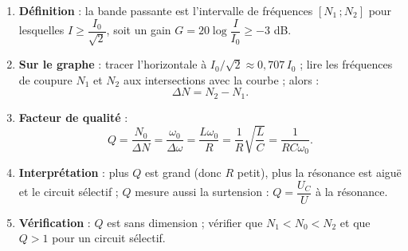 \documentclass[11pt]{article}
\begin{document}
\begin{methode}
\begin{enumerate}
\item \textbf{Définition} : la bande passante est l'intervalle de fréquences $[N_1\,;N_2]$ pour lesquelles $I \geq \dfrac{I_0}{\sqrt{2}}$, soit un gain $G = 20\log\dfrac{I}{I_0} \geq -3$ dB.
\item \textbf{Sur le graphe} : tracer l'horizontale à $I_0/\sqrt{2} \approx 0{,}707\,I_0$ ; lire les fréquences de coupure $N_1$ et $N_2$ aux intersections avec la courbe ; alors :
\[ \Delta N = N_2 - N_1. \]
\item \textbf{Facteur de qualité} :
\[ Q = \dfrac{N_0}{\Delta N} = \dfrac{\omega_0}{\Delta\omega} = \dfrac{L\omega_0}{R} = \dfrac{1}{R}\sqrt{\dfrac{L}{C}} = \dfrac{1}{RC\omega_0}. \]
\item \textbf{Interprétation} : plus $Q$ est grand (donc $R$ petit), plus la résonance est aiguë et le circuit sélectif ; $Q$ mesure aussi la surtension : $Q = \dfrac{U_C}{U}$ à la résonance.
\item \textbf{Vérification} : $Q$ est sans dimension ; vérifier que $N_1 < N_0 < N_2$ et que $Q > 1$ pour un circuit sélectif.
\end{enumerate}
\end{methode}
\end{document}
